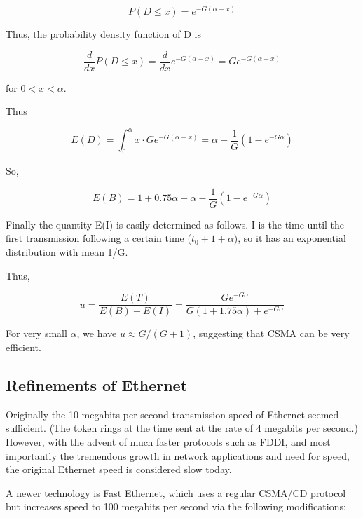 \documentclass[11pt]{article}
\begin{document}
\begin{equation}
P(D \le x) = e^{-G(\alpha - x)}
\end{equation}

Thus, the probability density function of D is

\begin{equation}
\frac{d}{dx} P(D \le x) = \frac{d}{dx} e^{-G(\alpha - x)} = 
G e^{-G(\alpha - x)}
\end{equation}

for $0 < x < \alpha$.

Thus

\begin{equation}
E(D) = \int_0^\alpha x \cdot G e^{-G(\alpha - x)} = 
\alpha - \frac{1}{G} (1 - e^{-G\alpha})
\end{equation}

So,

\begin{equation}
E(B) = 1 + 0.75 \alpha + \alpha - \frac{1}{G} (1 - e^{-G\alpha})
\end{equation}

Finally the quantity E(I) is easily determined as follows.  I is the
time until the first transmission following a certain time ($t_0 + 1 +
\alpha$), so it has an exponential distribution with mean 1/G.

Thus,

\begin{equation}
u = \frac{E(T)}{E(B) + E(I)} = 
\frac{Ge^{-G\alpha}}{G(1+1.75\alpha) + e^{-G\alpha}}
\end{equation}

For very small $\alpha$, we have $u \approx G/(G+1)$, suggesting that
CSMA can be very efficient.

\subsection{Refinements of Ethernet}

Originally the 10 megabits per second transmission speed of Ethernet
seemed sufficient.  (The token rings at the time sent at the rate of
4 megabits per second.)  However, with the advent of much faster
protocols such as FDDI, and most importantly the tremendous growth
in network applications and need for speed, the original Ethernet
speed is considered slow today.

A newer technology is Fast Ethernet, which uses a regular CSMA/CD
protocol but increases speed to 100 megabits per second via the
following modifications:
\end{document}
